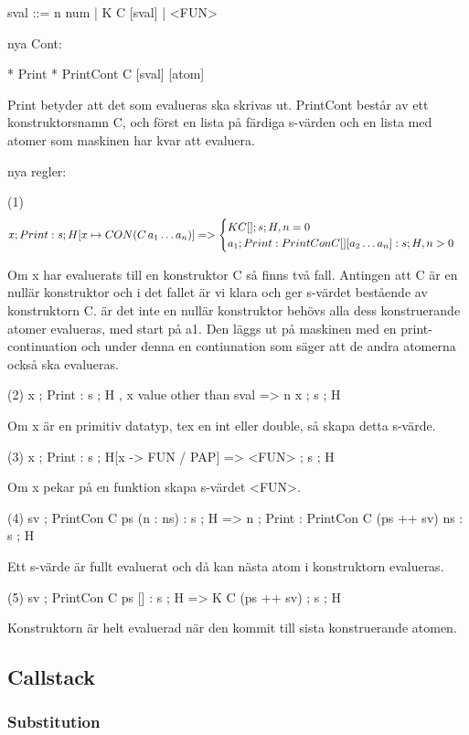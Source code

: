 \documentclass[../Core]{subfiles}
\begin{document}
\begin{codeEx}  
sval ::= n num
       | K C [sval]
       | <FUN>
\end{codeEx}

nya Cont:

* Print
* PrintCont C [sval] [atom]

Print betyder att det som evalueras ska skrivas ut. PrintCont består av ett
konstruktorsnamn C, och först en lista på färdiga s-värden och en lista med
atomer som maskinen har kvar att evaluera.

nya regler:

(1)
\[
x ; Print : s ; H[x \mapsto CON(C\,a_1 \ldots a_n)]
=> \begin{cases} 
K C [] ; s ; H , n = 0 \\
a_1 ; Print : PrintCon C [] [a_2 \ldots a_n] : s ; H , n > 0
\end{cases}
\]

Om x har evaluerats till en konstruktor C så finns två fall. Antingen att C är
en nullär konstruktor och i det fallet är vi klara och ger s-värdet bestående
av konstruktorn C.
    är det inte en nullär konstruktor behövs alla dess konstruerande atomer
evalueras, med start på a1. Den läggs ut på maskinen med en print-continuation
och under denna en contiunation som säger att de andra atomerna också ska
evalueras.
 
(2)
x ; Print : s ; H , x value other than sval
=> n x ; s ; H

Om x är en primitiv datatyp, tex en int eller double, så skapa detta s-värde.

(3)
x ; Print : s ; H[x -> FUN / PAP]
=> <FUN> ; s ; H

Om x pekar på en funktion skapa s-värdet <FUN>.

(4)
sv ; PrintCon C ps (n : ns) : s ; H
=> n ; Print : PrintCon C (ps ++ sv) ns : s ; H

Ett s-värde är fullt evaluerat och då kan nästa atom i konstruktorn evalueras.  

(5)
sv ; PrintCon C ps [] : s ; H
=> K C (ps ++ sv) ; s ; H

Konstruktorn är helt evaluerad när den kommit till sista konstruerande atomen.


\subsection{Callstack}
\subsubsection{Substitution}
\end{document}
